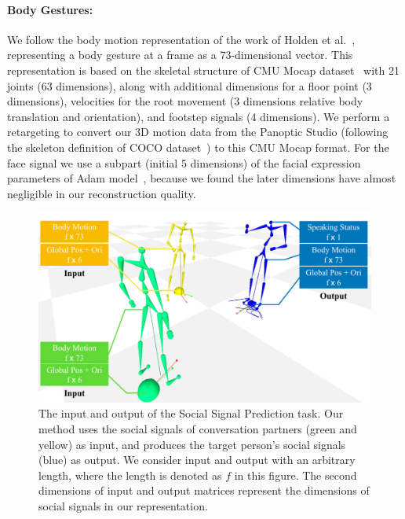 \paragraph{Body Gestures:} We follow the body motion representation of the work of Holden et al.~\cite{holden2016deep}, representing a body gesture at a frame as a 73-dimensional vector. This representation is based on the skeletal structure of CMU Mocap dataset~\cite{gross2001cmu} with 21 joints (63 dimensions), along with additional dimensions for a floor point (3 dimensions), velocities for the root movement (3 dimensions relative body translation and orientation), and footstep signals (4 dimensions). We perform a retargeting to convert our 3D motion data from the Panoptic Studio (following the skeleton definition of COCO dataset~\cite{coco-14}) to this CMU Mocap format. For the face signal we use a subpart (initial 5 dimensions) of the facial expression parameters of Adam model~\cite{joo2018,cao2014facewarehouse}, because we found the later dimensions have almost negligible in our reconstruction quality.

\begin{figure}[t]		
	\includegraphics[width=\linewidth]{ssp_fig/Input_output.pdf}
	\caption{The input and output of the Social Signal Prediction task. Our method uses the social signals of conversation partners (green and yellow) as input, and produces the target person's social signals (blue) as output. We consider input and output with an arbitrary length, where the length is denoted as $f$ in this figure. The second dimensions of input and output matrices represent the dimensions of social signals in our representation.}
	\label{fig:inputOutput}
\end{figure}

